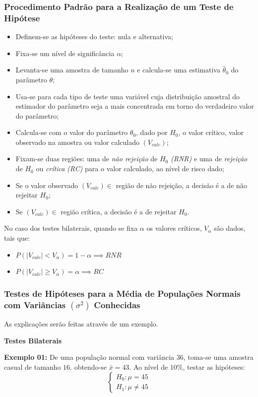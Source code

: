 \documentclass[oneside,a4paper,12pt]{article}
\begin{document}
\subsubsection{Procedimento Padrão para a Realização de um Teste de Hipótese}
\begin{itemize}
	\item Definem-se as hipóteses do teste: nula e alternativa;
	\item Fixa-se um nível de significância $\alpha$;
	\item Levanta-se uma amostra de tamanho $n$ e calcula-se uma estimativa $\hat{\theta}_0$ do parâmetro $\theta$;
	\item Usa-se para cada tipo de teste uma variável cuja distribuição amostral do estimador do parâmetro seja a mais concentrada em torno do verdadeiro valor do parâmetro;
	\item Calcula-se com o valor do parâmetro $\theta_0$, dado por $H_0$, o valor crítico, valor observado na amostra ou valor calculado $(V_{calc})$;
	\item Fixam-se duas regiões: uma de \emph{não rejeição} de $H_0$ \textit{(RNR)} e uma de \emph{rejeição} de $H_0$ ou \emph{crítica} \textit{(RC)} para o valor calculado, ao nível de risco dado;
	\item Se o valor observado $(V_{calc}) \in$ região de não rejeição, a decisão é a de não rejeitar $H_0$;
	\item Se $(V_{calc}) \in$ região crítica, a decisão é a de rejeitar $H_0$.
\end{itemize}
No caso dos testes bilaterais, quando se fixa $\alpha$ os valores críticos, $V_\alpha$ são dados, tais que:
\begin{itemize}
	\item $P(|V_{calc}| < V_{\alpha}) = 1 - \alpha \implies RNR$
	\item $P(|V_{calc}| \geq V_{\alpha}) = \alpha \implies RC$
\end{itemize}

\subsubsection{Testes de Hipóteses para a Média de Populações Normais com Variâncias $(\sigma^2)$ Conhecidas}

As explicações serão feitas através de um exemplo.

\textbf{Testes Bilaterais}

\textbf{Exemplo 01:} De uma população normal com variância $36$, toma-se uma amostra casual de tamanho $16$. obtendo-se $\bar{x} = 43$. Ao nível de $10\%$, testar as hipóteses:
$$\begin{cases}
H_0: \mu = 45\\
H_1: \mu \neq 45
\end{cases}
$$
\end{document}
